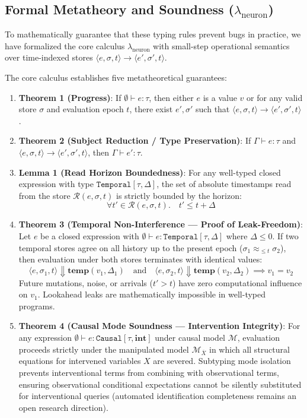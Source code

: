 \documentclass[11pt,a4paper]{article}
\newcommand{\ty}[1]{\texttt{#1}}
\begin{document}
\subsection{Formal Metatheory and Soundness ($\lambda_{\text{neuron}}$)}
\label{sec:formal-semantics}

To mathematically guarantee that these typing rules prevent bugs in practice, we have formalized the core calculus $\lambda_{\text{neuron}}$ with small-step operational semantics over time-indexed stores $\langle e, \sigma, t \rangle \longrightarrow \langle e', \sigma', t \rangle$. 

The core calculus establishes five metatheoretical guarantees:
\begin{enumerate}[itemsep=2pt]
  \item \textbf{Theorem 1 (Progress)}: If $\emptyset \vdash e : \tau$, then either $e$ is a value $v$ or for any valid store $\sigma$ and evaluation epoch $t$, there exist $e', \sigma'$ such that $\langle e, \sigma, t \rangle \longrightarrow \langle e', \sigma', t \rangle$.
  \item \textbf{Theorem 2 (Subject Reduction / Type Preservation)}: If $\Gamma \vdash e : \tau$ and $\langle e, \sigma, t \rangle \longrightarrow \langle e', \sigma', t \rangle$, then $\Gamma \vdash e' : \tau$.
  \item \textbf{Lemma 1 (Read Horizon Boundedness)}: For any well-typed closed expression with type $\ty{Temporal}[\tau, \Delta]$, the set of absolute timestamps read from the store $\mathcal{R}(e, \sigma, t)$ is strictly bounded by the horizon:
  \[
  \forall t' \in \mathcal{R}(e, \sigma, t).\quad t' \le t + \Delta
  \]
  \item \textbf{Theorem 3 (Temporal Non-Interference --- Proof of Leak-Freedom)}: Let $e$ be a closed expression with $\emptyset \vdash e : \ty{Temporal}[\tau, \Delta]$ where $\Delta \le 0$. If two temporal stores agree on all history up to the present epoch ($\sigma_1 \approx_{\le t} \sigma_2$), then evaluation under both stores terminates with identical values:
  \[
  \langle e, \sigma_1, t \rangle \Downarrow \mathbf{temp}(v_1, \Delta_1) \quad \text{and} \quad \langle e, \sigma_2, t \rangle \Downarrow \mathbf{temp}(v_2, \Delta_2) \implies v_1 = v_2
  \]
  Future mutations, noise, or arrivals ($t' > t$) have zero computational influence on $v_1$. Lookahead leaks are mathematically impossible in well-typed programs.
  \item \textbf{Theorem 4 (Causal Mode Soundness --- Intervention Integrity)}: For any expression $\emptyset \vdash e : \ty{Causal}[\tau, \mathbf{int}]$ under causal model $\mathcal{M}$, evaluation proceeds strictly under the manipulated model $\mathcal{M}_{\overline{X}}$ in which all structural equations for intervened variables $X$ are severed. Subtyping mode isolation prevents interventional terms from combining with observational terms, ensuring observational conditional expectations cannot be silently substituted for interventional queries (automated identification completeness remains an open research direction).
\end{enumerate}
\end{document}
